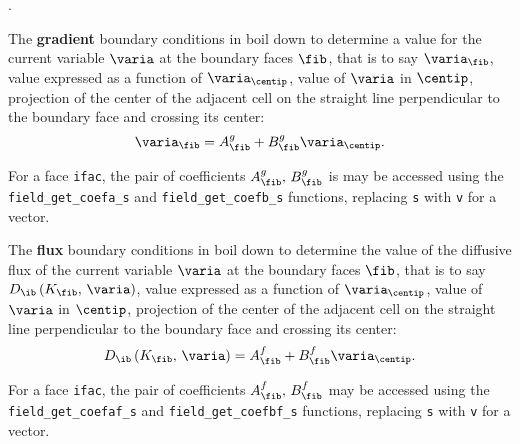 {{{{



.

The \textbf{gradient} boundary conditions in \CS boil down to determine a value for the
current variable $\varia$ at the boundary faces $\fib$, that is to say $\varia_\fib$,
value expressed as a function of $\varia_{\centip}$, value of $\varia$ in $\centip$,
projection of the center of the adjacent cell on the straight line
perpendicular to the boundary face and crossing its center:
\begin{equation}
\varia_\fib=A_{\fib}^g +B_{\fib}^g \varia_{\centip}.
\end{equation}

For a face \texttt{ifac}, the pair of coefficients $A_{\fib}^g , \, B_{\fib}^g$ is
may be accessed using the \texttt{field\_get\_coefa\_s} and
\texttt{field\_get\_coefb\_s} functions, replacing \texttt{s} with \texttt{v}
for a vector.

The \textbf{flux} boundary conditions in \CS boil down to determine the value of the diffusive
flux of the
current variable $\varia$ at the boundary faces $\fib$, that is to say
 $D_{\ib} \left(K_\fib, \, \varia \right)$,
value expressed as a function of $\varia_{\centip}$, value of $\varia$ in $\centip$,
projection of the center of the adjacent cell on the straight line
perpendicular to the boundary face and crossing its center:
\begin{equation}
D_{\ib} \left(K_\fib, \, \varia \right) = A_{\fib}^f +B_{\fib}^f \varia_{\centip}.
\end{equation}

For a face \texttt{ifac}, the pair of coefficients $A_{\fib}^f , \, B_{\fib}^f$
may be accessed using the \texttt{field\_get\_coefaf\_s} and
\texttt{field\_get\_coefbf\_s} functions, replacing \texttt{s} with \texttt{v}
for a vector.

}}}}
